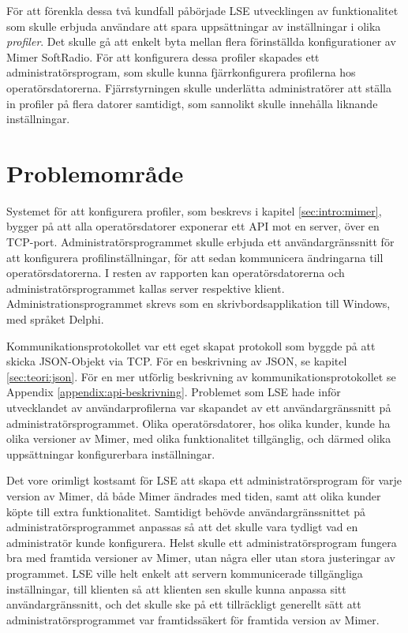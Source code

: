 För att förenkla dessa två kundfall påbörjade LSE utvecklingen av funktionalitet som skulle erbjuda användare att spara uppsättningar av inställningar i olika \textit{profiler}. Det skulle gå att enkelt byta mellan flera förinställda konfigurationer av Mimer SoftRadio. För att konfigurera dessa profiler skapades ett administratörsprogram, som skulle kunna fjärrkonfigurera profilerna hos operatörsdatorerna. Fjärrstyrningen skulle underlätta administratörer att ställa in profiler på flera datorer samtidigt, som sannolikt skulle innehålla liknande inställningar.

\section{Problemområde}
\label{sec:intro:problemområde}
Systemet för att konfigurera profiler, som beskrevs i kapitel \ref{sec:intro:mimer}, bygger på att alla operatörsdatorer exponerar ett API mot en server, över en TCP-port. Administratörsprogrammet skulle erbjuda ett användargränssnitt för att konfigurera profilinställningar, för att sedan kommunicera ändringarna till operatörsdatorerna. I resten av rapporten kan operatörsdatorerna och administratörsprogrammet kallas server respektive klient. Administrationsprogrammet skrevs som en skrivbordsapplikation till Windows, med språket Delphi.

Kommunikationsprotokollet var ett eget skapat protokoll som byggde på att skicka JSON-Objekt via TCP. För en beskrivning av JSON, se kapitel \ref{sec:teori:json}. För en mer utförlig beskrivning av kommunikationsprotokollet se Appendix \ref{appendix:api-beskrivning}. Problemet som LSE hade inför utvecklandet av användarprofilerna var skapandet av ett användargränssnitt på administratörsprogrammet. Olika operatörsdatorer, hos olika kunder, kunde ha olika versioner av Mimer, med olika funktionalitet tillgänglig, och därmed olika uppsättningar konfigurerbara inställningar. 

Det vore orimligt kostsamt för LSE att skapa ett administratörsprogram för varje version av Mimer, då både Mimer ändrades med tiden, samt att olika kunder köpte till extra funktionalitet. Samtidigt behövde användargränssnittet på administratörsprogrammet anpassas så att det skulle vara tydligt vad en administratör kunde konfigurera. Helst skulle ett administratörsprogram fungera bra med framtida versioner av Mimer, utan några eller utan stora justeringar av programmet. LSE ville helt enkelt att servern kommunicerade tillgängliga inställningar, till klienten så att klienten sen skulle kunna anpassa sitt användargränssnitt, och det skulle ske på ett tillräckligt generellt sätt att administratörsprogrammet var framtidssäkert för framtida version av Mimer.

